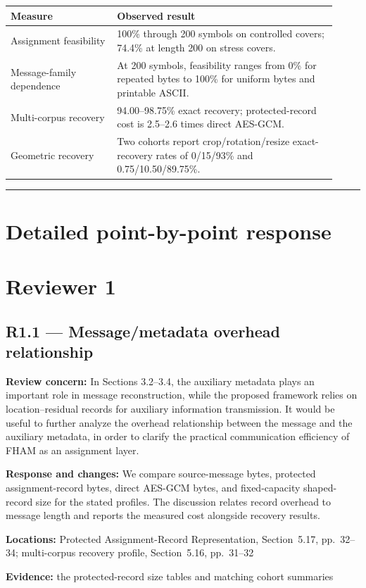 \documentclass[12pt,a4paper]{article}
\newcommand{\revcomment}[1]{\par\medskip\noindent\textbf{Review concern:} #1\par\smallskip}
\newcommand{\responsechanges}[1]{\par\noindent\textbf{Response and changes:} #1\par}
\newcommand{\locations}[1]{\par\noindent\textbf{Locations:} #1\par}
\newcommand{\evidence}[1]{\par\noindent\textbf{Evidence:} #1\par\smallskip}
\begin{document}
\begin{center}\small
\begin{tabular}{p{0.30\linewidth}p{0.62\linewidth}}
\toprule\textbf{Measure} & \textbf{Observed result}\\\midrule
Assignment feasibility & 100\% through 200 symbols on controlled covers; 74.4\% at length 200 on stress covers.\\
Message-family dependence & At 200 symbols, feasibility ranges from 0\% for repeated bytes to 100\% for uniform bytes and printable ASCII.\\
Multi-corpus recovery & 94.00--98.75\% exact recovery; protected-record cost is 2.5--2.6 times direct AES-GCM.\\
Geometric recovery & Two cohorts report crop/rotation/resize exact-recovery rates of 0/15/93\% and 0.75/10.50/89.75\%.\\
\bottomrule\end{tabular}\end{center}

\vspace{1em}\hrule\vspace{1em}
\section*{Detailed point-by-point response}
\section*{Reviewer 1}

\subsection*{R1.1 --- Message/metadata overhead relationship}

\revcomment{In Sections 3.2--3.4, the auxiliary metadata plays an important role in message reconstruction, while the proposed framework relies on location--residual records for auxiliary information transmission. It would be useful to further analyze the overhead relationship between the message and the auxiliary metadata, in order to clarify the practical communication efficiency of FHAM as an assignment layer.}
\responsechanges{We compare source-message bytes, protected assignment-record bytes, direct AES-GCM bytes, and fixed-capacity shaped-record size for the stated profiles. The discussion relates record overhead to message length and reports the measured cost alongside recovery results.}
\locations{Protected Assignment-Record Representation, Section~5.17, pp.~32--34; multi-corpus recovery profile, Section~5.16, pp.~31--32}
\evidence{the protected-record size tables and matching cohort summaries}
\end{document}
